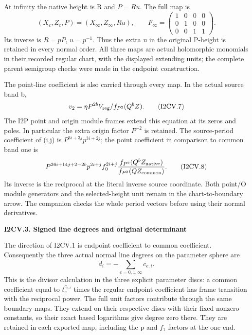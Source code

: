At infinity the native height is R and \(P=Ru\). The full map is
\[
 (X_c,Z_c,P)=(X_\infty,Z_\infty,Ru),\qquad
 F_\infty=\begin{pmatrix}1&0&0&0\\0&1&0&0\\0&0&1&1\end{pmatrix}.
\tag{I2CV.6}
\]
Its inverse is \(R=pP\), \(u=p^{-1}\). Thus the extra u in the original
P-height is retained in every normal order. All three maps are
actual holomorphic monomials in their recorded regular chart,
with the displayed extending units; the complete parent semigroup
checks were made in the endpoint construction.

The point-line coefficient is also carried through every map. In
the actual source band b,
\[
 v_2=\eta P^{2b}V_{\rm reg}/f_{P^2}(Q^bZ).
\tag{I2CV.7}
\]
The I2P point and origin module frames extend this equation at its
zeros and poles. In particular the extra origin factor \(P^{-2}\)
is retained. The source-period coefficient of (i,j) is
\(P^{3i+3j}p^{3i+2j}\); the point coefficient in comparison to common
band one is
\[
 P^{26i+14j+2-2b}p^{2i+j}f_0^{2i+j}
 \frac{f_{P^2}(Q^bZ_{\rm native})}{f_{P^2}(QZ_{\rm common})}.
\tag{I2CV.8}
\]
Its inverse is the reciprocal at the literal inverse source
coordinate. Both point/O module generators and the selected-height
unit remain in the chart-to-boundary arrow. The companion checks
the whole period vectors before using their normal derivatives.

\par

\medskip\noindent\textbf{I2CV.3. Signed line degrees and original determinant}

\par\nobreak

The direction of I2CV.1 is endpoint coefficient to common
coefficient. Consequently the three actual normal line degrees on
the parameter sphere are
\[
                              d_i=-\sum_{e=0,1,\infty}c_{e,i}.
\tag{I2CV.9}
\]
This is the divisor calculation in the three explicit parameter
discs: a common coefficient equal to \(t_e^{c_{e,i}}\) times the
regular endpoint coefficient has frame transition with the
reciprocal power. The full unit factors contribute through the
same boundary maps. They extend on their respective discs with
their fixed nonzero constants, so their exact based logarithms
give degree zero there. They are retained in each exported map,
including the p and \(f_1\) factors at the one end.

